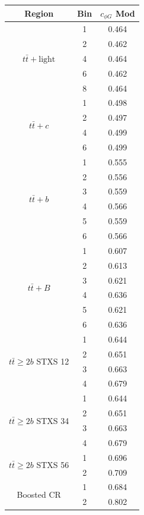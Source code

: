 
\begin{tabular}{|c|c|c|}
\hline
\textbf{Region} & \textbf{Bin} & \textbf{$c_{\phi G}$ Mod} \\
\hline
\multirow{5}{*}{$t\bar{t} + \text{light}$} & 1 & 0.464 \\
                          & 2 & 0.462 \\

                          & 4 & 0.464\\

                          & 6 & 0.462 \\

                          & 8 & 0.464\\
\hline
\multirow{4}{*}{$t\bar{t}+c$} & 1 &0.498 \\
                          & 2 &0.497\\

                          & 4 &0.499 \\

                          & 6 &0.499 \\
\hline
\multirow{6}{*}{$t\bar{t} +b$} & 1 & 0.555 \\
                          & 2 & 0.556 \\
                          & 3 & 0.559\\
                          & 4 & 0.566 \\
                          & 5 & 0.559\\
                          & 6 & 0.566 \\
\hline
\multirow{6}{*}{$t\bar{t}+ B$} & 1 & 0.607\\
                          & 2 & 0.613 \\
                          & 3 & 0.621 \\
                          & 4 & 0.636\\
                          & 5 & 0.621 \\
                          & 6 & 0.636\\
\hline
\multirow{4}{*}{$t\bar{t} \geq 2b$ STXS 12} & 1 & 0.644 \\
                          & 2 & 0.651 \\
                          & 3 & 0.663 \\
                          & 4 & 0.679 \\
\hline
\multirow{4}{*}{$t\bar{t} \geq 2b$ STXS 34}& 1 & 0.644 \\
                          & 2 & 0.651 \\
                          & 3 & 0.663 \\
                          & 4 & 0.679 \\
\hline
\multirow{2}{*}{$t\bar{t} \geq 2b$ STXS 56}& 1 & 0.696 \\
                          & 2 & 0.709 \\

\hline
\multirow{2}{*}{Boosted CR} & 1 & 0.684\\
                          & 2 & 0.802 \\
\hline
\end{tabular}

